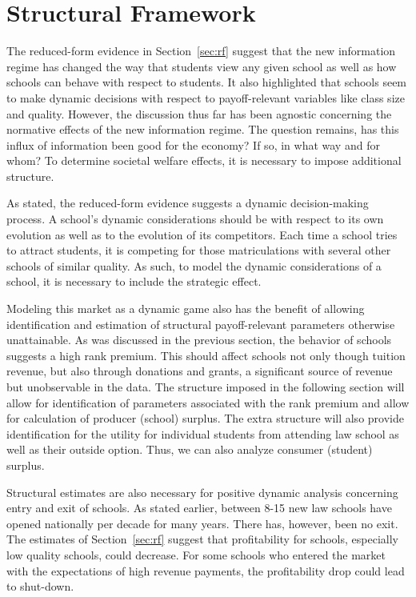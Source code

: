 \documentclass[12pt]{article}
\theoremstyle{definition}
\begin{document}
\section{Structural Framework}
\label{sec:structural}

The reduced-form evidence in Section~\ref{sec:rf} suggest that the new information regime has changed the way that students view any given school as well as how schools can behave with respect to students. It also highlighted that schools seem to make dynamic decisions with respect to payoff-relevant variables like class size and quality. However, the discussion thus far has been agnostic concerning the normative effects of the new information regime. The question remains, has this influx of information been good for the economy? If so, in what way and for whom? To determine societal welfare effects, it is necessary to impose additional structure.

As stated, the reduced-form evidence suggests a dynamic decision-making process. A school's dynamic considerations should be with respect to its own evolution as well as to the evolution of its competitors. Each time a school tries to attract students, it is competing for those matriculations with several other schools of similar quality. As such, to model the dynamic considerations of a school, it is necessary to include the strategic effect.

Modeling this market as a dynamic game also has the benefit of allowing identification and estimation of structural payoff-relevant parameters otherwise unattainable. As was discussed in the previous section, the behavior of schools suggests a high rank premium. This should affect schools not only though tuition revenue, but also through donations and grants, a significant source of revenue but unobservable in the data. The structure imposed in the following section will allow for identification of parameters associated with the rank premium and allow for calculation of producer (school) surplus. The extra structure will also provide identification for the utility for individual students from attending law school as well as their outside option. Thus, we can also analyze consumer (student) surplus.

Structural estimates are also necessary for positive dynamic analysis concerning entry and exit of schools. As stated earlier, between 8-15 new law schools have opened nationally per decade for many years. There has, however, been no exit. The estimates of Section~\ref{sec:rf} suggest that profitability for schools, especially low quality schools, could decrease. For some schools who entered the market with the expectations of high revenue payments, the profitability drop could lead to shut-down.
\end{document}
